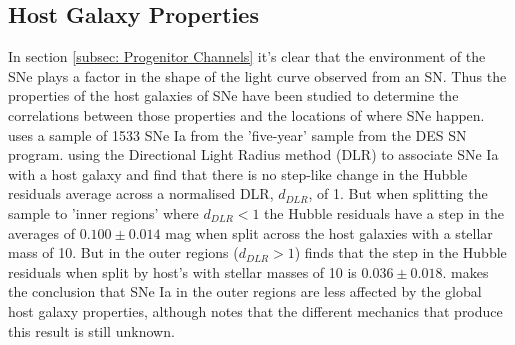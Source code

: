\subsection{Host Galaxy Properties} \label{subsec: Host Galaxy Properties}
In section \ref{subsec: Progenitor Channels} it's clear that the environment of the SNe plays a factor in the shape of the light curve observed from an SN. Thus the properties of the host galaxies of SNe have been studied to determine the correlations between those properties and the locations of where SNe happen. \textcite{toy_reduction_2025} uses a sample of 1533 SNe Ia from the 'five-year' sample from the DES SN program. \textcite{toy_reduction_2025} using the Directional Light Radius method (DLR) to associate SNe Ia with a host galaxy and find that there is no step-like change in the Hubble residuals average across a normalised DLR, \(d_{DLR}\), of 1. But when splitting the sample to 'inner regions' where \(d_{DLR} < 1\) the Hubble residuals have a step in the averages of \(0.100 \pm 0.014\) mag when split across the host galaxies with a stellar mass of 10. But in the outer regions (\(d_{DLR}>1\)) \textcite{toy_reduction_2025} finds that the step in the Hubble residuals when split by host's with stellar masses of 10 is \(0.036\pm0.018\). \textcite{toy_reduction_2025} makes the conclusion that SNe Ia in the outer regions are less affected by the global host galaxy properties, although \textcite{toy_reduction_2025} notes that the different mechanics that produce this result is still unknown.

